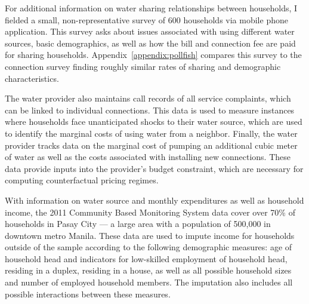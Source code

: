 \documentclass[12pt]{article}
\begin{document}

For additional information on water sharing relationships between households, I fielded a small, non-representative survey of 600 households via mobile phone application.  This survey asks about issues associated with using different water sources, basic demographics, as well as how the bill and connection fee are paid for sharing households.  Appendix~\ref{appendix:pollfish} compares this survey to the connection survey finding roughly similar rates of sharing and demographic characteristics.


The water provider also maintains call records of all service complaints, which can be linked to individual connections.  This data is used to measure instances where households face unanticipated shocks to their water source, which are used to identify the marginal costs of using water from a neighbor.  Finally, the water provider tracks data on the marginal cost of pumping an additional cubic meter of water as well as the costs associated with installing new connections.  These data provide inputs into the provider's budget constraint, which are necessary for computing counterfactual pricing regimes.  

With information on water source and monthly expenditures as well as household income, the 2011 Community Based Monitoring System data cover over 70\% of households in Pasay City --- a large area with a population of 500,000 in downtown metro Manila.  These data are used to impute income for households outside of the sample according to the following demographic measures: age of household head and indicators for low-skilled employment of household head, residing in a duplex, residing in a house, as well as all possible household sizes and number of employed household members.  The imputation also includes all possible interactions between these measures.
\end{document}
